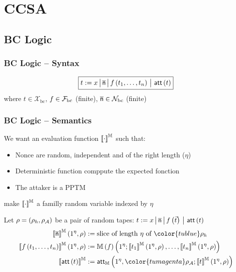 \documentclass[aspectratio=169]{beamer}
\begin{document}
\section{CCSA}
\subsection{BC Logic}
\begin{frame}
  \frametitle{BC Logic -- Syntax}

  \[
      \boxed{t:= x \,\big|\, \overline{\mathsf{n}} \,\big|\, f\left( t_1, \dots, t_n \right) \,\big|\, \operatorname{\mathsf{att}}\left( t \right)}
  \]  
  where $t\in \mathcal{X}_\mathrm{bc}$, $f\in\mathcal{F}_\mathrm{bc}$ (finite), $\overline{\mathsf{n}}\in\mathcal{N}_\mathrm{bc}$ (finite)

\end{frame}

\begin{frame}
  \frametitle{BC Logic -- Semantics}

  We want an evaluation function $\mevalbc{\cdot}$ such that:
  \begin{itemize}
    \item Nonce are random\pause, independent \pause and of the right length ($\eta$)\pause
    \item Deterministic function comppute the expected fonction\pause
    \item The attaker is a PPTM
  \end{itemize}\pause

  \Rightarrow make $\mevalbc{\cdot}$ a familly random variable indexed by $\eta$
  \pause

  Let $\rho =\left( \rho_h, \rho_{\mathcal{A}} \right)$ be a pair of random tapes:
  \hfill {\footnotesize $t:= x \,\big|\, \overline{\mathsf{n}} \,\big|\, f\left( \vec{t} \right) \,\big|\, \operatorname{\mathsf{att}}\left( t \right)$}
  \begin{align*}
    \mevalbc{\n}\left( 1^\eta, \rho \right)&:= \text{slice of length $\eta$ of ${\color{tublue}\rho_h}$}\\
    \mevalbc{f\left( t_1, \dots, t_n \right)}\left( 1^\eta, \rho \right)&:= \mathbb{M}\left( f \right)\left( 1^\eta; \mevalbc{t_1}\left( 1^\eta, \rho \right), \dots,  \mevalbc{t_n}\left( 1^\eta, \rho \right) \right)\\
    \mevalbc{\matt\left( t \right)}&:= \matt_\mathbb{M}\left( 1^\eta, {\color{tumagenta} \rho_\AAA}; \mevalbc{t}\left(1^\eta, \rho \right) \right)
  \end{align*}
\end{frame}
\end{document}
